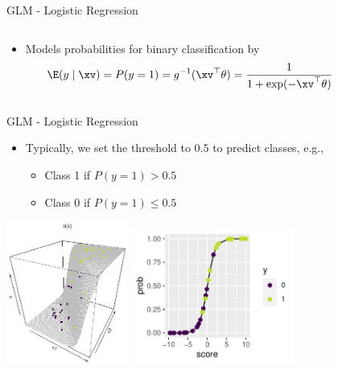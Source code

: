\documentclass[11pt,compress,t,notes=noshow, aspectratio=169, xcolor=table]{beamer}
\begin{document}
\begin{frame}{GLM - Logistic Regression}
\begin{columns}[T, totalwidth=\textwidth]
\begin{column}{0.6\textwidth}
\begin{itemize}
    \item Models probabilities for binary classification by
    $$\E(y \mid \xv) = P(y = 1) = g^{-1}(\xv^\top \theta) = \frac{1}{1 + \exp(- \xv^\top \theta)} $$
\end{itemize}
\end{column}
\begin{column}{0.4\textwidth}
\end{column}
\end{columns}

\end{frame}



\begin{frame}{GLM - Logistic Regression}

\begin{itemize}
    \item Typically, we set the threshold to $0.5$ to predict classes, e.g.,
    \begin{itemize}
        \item Class 1 if $P(y=1) > 0.5$
        \item Class 0 if $P(y=1) \leq 0.5$
    \end{itemize}
\end{itemize}

\centering
\includegraphics[width=0.3\textwidth]{figure/logreg-2vars-surface.png} \qquad
\includegraphics[width=0.4\textwidth]{figure/reg_class_log_7} 
\end{frame}
\end{document}
